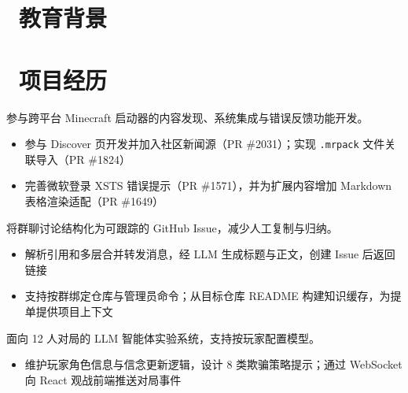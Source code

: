 \documentclass{resume}
\begin{document}


\section{\faGraduationCap\ 教育背景}

\section{\faUsers\ 项目经历}

参与跨平台 Minecraft 启动器的内容发现、系统集成与错误反馈功能开发。
\begin{itemize}
  \item 参与 Discover 页开发并加入社区新闻源（PR \#2031）；实现 \texttt{.mrpack} 文件关联导入（PR \#1824）
  \item 完善微软登录 XSTS 错误提示（PR \#1571），并为扩展内容增加 Markdown 表格渲染适配（PR \#1649）
\end{itemize}

将群聊讨论结构化为可跟踪的 GitHub Issue，减少人工复制与归纳。
\begin{itemize}
  \item 解析引用和多层合并转发消息，经 LLM 生成标题与正文，创建 Issue 后返回链接
  \item 支持按群绑定仓库与管理员命令；从目标仓库 README 构建知识缓存，为提单提供项目上下文
\end{itemize}

面向 12 人对局的 LLM 智能体实验系统，支持按玩家配置模型。
\begin{itemize}
  \item 维护玩家角色信息与信念更新逻辑，设计 8 类欺骗策略提示；通过 WebSocket 向 React 观战前端推送对局事件
\end{itemize}
\end{document}
